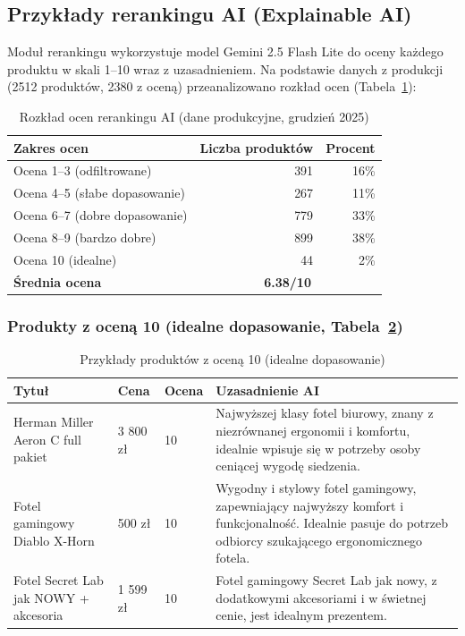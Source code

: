 \documentclass[12pt,a4paper]{article}
\begin{document}
\subsection{Przykłady rerankingu AI (Explainable AI)}

Moduł rerankingu wykorzystuje model Gemini 2.5 Flash Lite do oceny każdego produktu w skali 1--10 wraz z uzasadnieniem. Na podstawie danych z produkcji (2512 produktów, 2380 z oceną) przeanalizowano rozkład ocen (Tabela~\ref{tab:reranking-distribution}):

\begin{table}[H]
\centering
\small
\begin{tabular}{|l|r|r|}
\hline
\textbf{Zakres ocen} & \textbf{Liczba produktów} & \textbf{Procent} \\
\hline
Ocena 1--3 (odfiltrowane) & 391 & 16\% \\
Ocena 4--5 (słabe dopasowanie) & 267 & 11\% \\
Ocena 6--7 (dobre dopasowanie) & 779 & 33\% \\
Ocena 8--9 (bardzo dobre) & 899 & 38\% \\
Ocena 10 (idealne) & 44 & 2\% \\
\hline
\textbf{Średnia ocena} & \multicolumn{2}{c|}{\textbf{6.38/10}} \\
\hline
\end{tabular}
\caption{Rozkład ocen rerankingu AI (dane produkcyjne, grudzień 2025)}
\label{tab:reranking-distribution}
\end{table}

\subsubsection*{Produkty z oceną 10 (idealne dopasowanie, Tabela~\ref{tab:reranking-10})}
\begin{table}[H]
\centering
\small
\begin{tabular}{|p{}|p{}|p{}|p{}|}
\hline
\textbf{Tytuł} & \textbf{Cena} & \textbf{Ocena} & \textbf{Uzasadnienie AI} \\
\hline
Herman Miller Aeron C full pakiet & 3 800 zł & 10 & Najwyższej klasy fotel biurowy, znany z niezrównanej ergonomii i komfortu, idealnie wpisuje się w potrzeby osoby ceniącej wygodę siedzenia. \\
\hline
Fotel gamingowy Diablo X-Horn & 500 zł & 10 & Wygodny i stylowy fotel gamingowy, zapewniający najwyższy komfort i funkcjonalność. Idealnie pasuje do potrzeb odbiorcy szukającego ergonomicznego fotela. \\
\hline
Fotel Secret Lab jak NOWY + akcesoria & 1 599 zł & 10 & Fotel gamingowy Secret Lab jak nowy, z dodatkowymi akcesoriami i w świetnej cenie, jest idealnym prezentem. \\
\hline
\end{tabular}
\caption{Przykłady produktów z oceną 10 (idealne dopasowanie)}
\label{tab:reranking-10}
\end{table}
\end{document}
